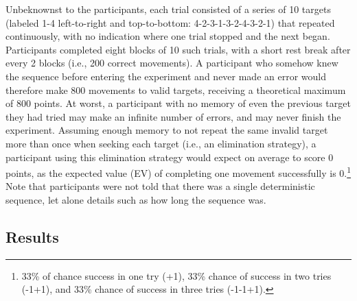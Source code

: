 \documentclass[man,floatsintext]{apa6}
\begin{document}
Unbeknownst to the participants, each trial consisted of a series of 10 targets (labeled 1-4 left-to-right and top-to-bottom: 4-2-3-1-3-2-4-3-2-1) that repeated continuously, with no indication where one trial stopped and the next began. Participants completed eight blocks of 10 such trials,  with a short rest break after every 2 blocks (i.e., 200 correct movements). A participant who somehow knew the sequence before entering the experiment and never made an error would therefore make 800 movements to valid targets, receiving a theoretical maximum of 800 points. At worst, a participant with no memory of even the previous target they had tried may make an infinite number of errors, and may never finish the experiment. Assuming enough memory to not repeat the same invalid target more than once when seeking each target (i.e., an elimination strategy), a participant using this elimination strategy would expect on average to score 0 points, as the expected value (EV) of completing one movement successfully is 0.\footnote{33\% of chance success in one try (+1), 33\% chance of success in two tries (-1+1), and 33\% chance of success in three tries (-1-1+1).} Note that participants were not told that there was a single deterministic sequence, let alone details such as how long the sequence was. 

\subsection{Results}

\end{document}
